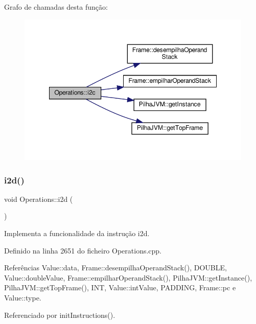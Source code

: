 Grafo de chamadas desta função\+:
\nopagebreak
\begin{figure}[H]
\begin{center}
\leavevmode
\includegraphics[width=348pt]{classOperations_a43b01132bf9acf598d0ced8719c194c7_cgraph}
\end{center}
\end{figure}
\mbox{\label{classOperations_aee9ee24acc934bcf51340dc54d6ed231}} 
\subsubsection{\texorpdfstring{i2d()}{i2d()}}
{\footnotesize\ttfamily void Operations\+::i2d (\begin{DoxyParamCaption}{ }\end{DoxyParamCaption})\hspace{0.3cm}{\ttfamily [private]}}



Implementa a funcionalidade da instrução i2d. 



Definido na linha 2651 do ficheiro Operations.\+cpp.



Referências Value\+::data, Frame\+::desempilha\+Operand\+Stack(), D\+O\+U\+B\+LE, Value\+::double\+Value, Frame\+::empilhar\+Operand\+Stack(), Pilha\+J\+V\+M\+::get\+Instance(), Pilha\+J\+V\+M\+::get\+Top\+Frame(), I\+NT, Value\+::int\+Value, P\+A\+D\+D\+I\+NG, Frame\+::pc e Value\+::type.



Referenciado por init\+Instructions().


